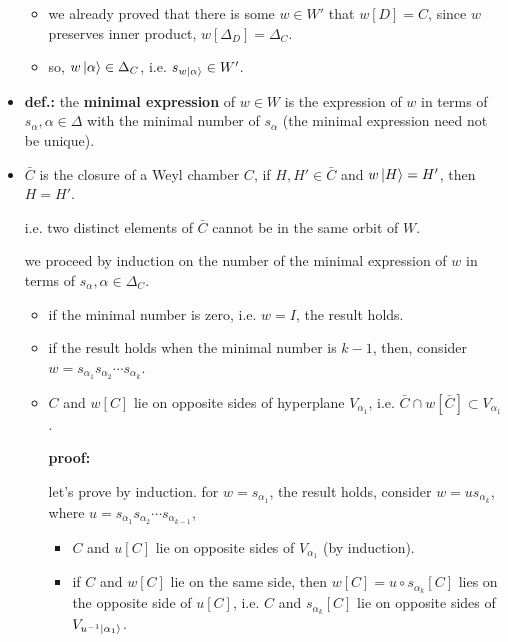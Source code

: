 \begin{itemize}
\begin{tcolorbox}[title=proof:]
\begin{itemize}
			\item we already proved that there is some $w \in W'$ that $w[D] = C$, since $w$ preserves inner product, $w[\Delta_D] = \Delta_C$.
			
			\item so, $w \ket{\alpha} \in \Delta_C$, i.e. $s_{w \ket{\alpha}} \in W'$.
		\end{itemize}
	\end{tcolorbox}
	
	\item \textbf{def.:} the \textbf{minimal expression} of $w \in W$ is the expression of $w$ in terms of $s_\alpha, \alpha \in \Delta$ with the minimal number of $s_\alpha$ (the minimal expression need not be unique).
	
	\item $\bar{C}$ is the closure of a Weyl chamber $C$, if $H, H' \in \bar{C}$ and $w \ket{H} = H'$, then $H = H'$.
	
	i.e. two distinct elements of $\bar{C}$ cannot be in the same orbit of $W$.
	
	\begin{tcolorbox}[title=proof:]
		we proceed by induction on the number of the minimal expression of $w$ in terms of $s_\alpha, \alpha \in \Delta_C$.
		\begin{itemize}
			\item if the minimal number is zero, i.e. $w = I$, the result holds.
			
			\item if the result holds when the minimal number is $k - 1$, then, consider $w = s_{\alpha_1} s_{\alpha_2} \cdots s_{\alpha_k}$.
			
			\item $C$ and $w[C]$ lie on opposite sides of hyperplane $V_{\alpha_1}$, i.e. $\bar{C} \cap w[\bar{C}] \subset V_{\alpha_1}$.
			
			\noindent\hdashrule[0.5ex]{\linewidth}{0.5pt}{1mm} %
			
			\textbf{proof:}
			
			let's prove by induction. for $w = s_{\alpha_1}$, the result holds, consider $w = u s_{\alpha_k}$, where $u = s_{\alpha_1} s_{\alpha_2} \cdots s_{\alpha_{k - 1}}$,
			\begin{itemize}
				\item $C$ and $u[C]$ lie on opposite sides of $V_{\alpha_1}$ (by induction).
				
				\item if $C$ and $w[C]$ lie on the same side, then $w[C] = u \circ s_{\alpha_k}[C]$ lies on the opposite side of $u[C]$, i.e. $C$ and $s_{\alpha_k}[C]$ lie on opposite sides of $V_{u^{- 1} \ket{\alpha_1}}$.
				

\end{itemize}
\end{itemize}
\end{tcolorbox}
\end{itemize}
